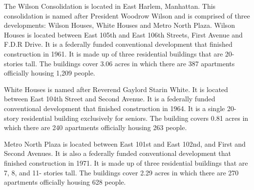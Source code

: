      

   

The Wilson Consolidation is located in East Harlem, Manhattan. This consolidation is named after President Woodrow Wilson and is comprised of three developments: Wilson Houses, White Houses and Metro North Plaza. Wilson Houses is located between East 105th and East 106th Streets, First Avenue and F.D.R Drive. It is a federally funded conventional development that finished construction in 1961. It is made up of three residential buildings that are 20- stories tall. The buildings cover 3.06 acres in which there are 387 apartments officially housing 1,209 people. 

White Houses is named after Reverend Gaylord Starin White. It is located between East 104th Street and Second Avenue. It is a federally funded conventional development that finished construction in 1964. It is a single 20- story residential building exclusively for seniors. The building covers 0.81 acres in which there are 240 apartments officially housing 263 people. 

Metro North Plaza is located between East 101st and East 102nd, and First and Second Avenues. It is also a federally funded conventional development that finished construction in 1971. It is made up of three residential buildings that are 7, 8, and 11- stories tall. The buildings cover 2.29 acres in which there are 270  apartments officially housing 628  people.